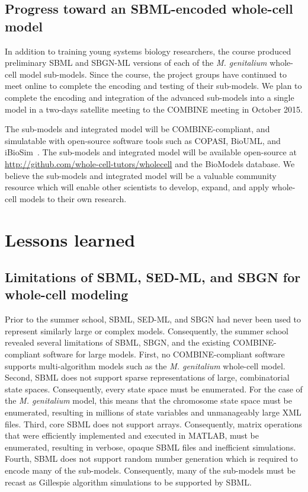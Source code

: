 \documentclass[journal,transmag]{IEEEtran}
\begin{document}
\subsection{Progress toward an SBML-encoded whole-cell model}
In addition to training young systems biology researchers, the course produced preliminary SBML and SBGN-ML versions of each of the \textit{M. genitalium} whole-cell model sub-models.
Since the course, the project groups have continued to meet online to complete the encoding and testing of their sub-models.
We plan to complete the encoding and integration of the advanced sub-models into a single model in a two-days satellite meeting to the COMBINE meeting in October 2015. 

The sub-models and integrated model will be COMBINE-compliant, and simulatable with open-source software tools such as COPASI, BioUML, and iBioSim~\cite{Stevens2013}.
The sub-models and integrated model will be available open-source at \url{http://github.com/whole-cell-tutors/wholecell} and the BioModels database.
We believe the sub-models and integrated model will be a valuable community resource which will enable other scientists to develop, expand, and apply whole-cell models to their own research.

\section{Lessons learned}

\subsection{Limitations of SBML, SED-ML, and SBGN for whole-cell modeling}
Prior to the summer school, SBML, SED-ML, and SBGN had never been used to represent similarly large or complex models. 
Consequently, the summer school revealed several limitations of SBML, SBGN, and the existing COMBINE-compliant software for large models.
First, no COMBINE-compliant software supports multi-algorithm models such as the \textit{M. genitalium} whole-cell model. 
Second, SBML does not support sparse representations of large, combinatorial state spaces. Consequently, every state space must be enumerated. For the case of the \textit{M. genitalium} model, this means that the chromosome state space must be enumerated, resulting in millions of state variables and unmanageably large XML files.
Third, core SBML  does not support arrays. Consequently, matrix operations that were efficiently implemented and executed in MATLAB, must be enumerated, resulting in verbose, opaque SBML files and inefficient simulations.
Fourth, SBML does not support random number generation which is required to encode many of the sub-models. Consequently, many of the sub-models must be recast as Gillespie algorithm simulations to be supported by SBML.
\end{document}
